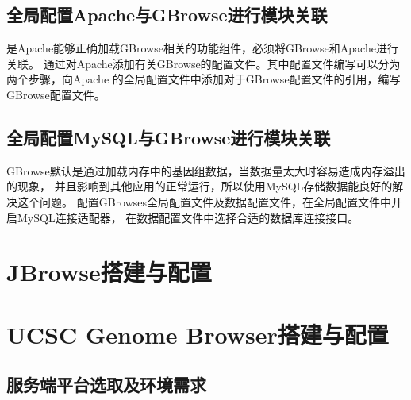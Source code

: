	\subsection{全局配置Apache与GBrowse进行模块关联}
	是Apache能够正确加载GBrowse相关的功能组件，必须将GBrowse和Apache进行关联。
	通过对Apache添加有关GBrowse的配置文件。其中配置文件编写可以分为两个步骤，向Apache
	的全局配置文件中添加对于GBrowse配置文件的引用，编写GBrowse配置文件。
	\subsection{全局配置MySQL与GBrowse进行模块关联}
	GBrowse默认是通过加载内存中的基因组数据，当数据量太大时容易造成内存溢出的现象，
	并且影响到其他应用的正常运行，所以使用MySQL存储数据能良好的解决这个问题。
	配置GBrowses全局配置文件及数据配置文件，在全局配置文件中开启MySQL连接适配器，
	在数据配置文件中选择合适的数据库连接接口。
	\section{JBrowse搭建与配置}
	\section{UCSC Genome Browser搭建与配置}
	\subsection{服务端平台选取及环境需求}